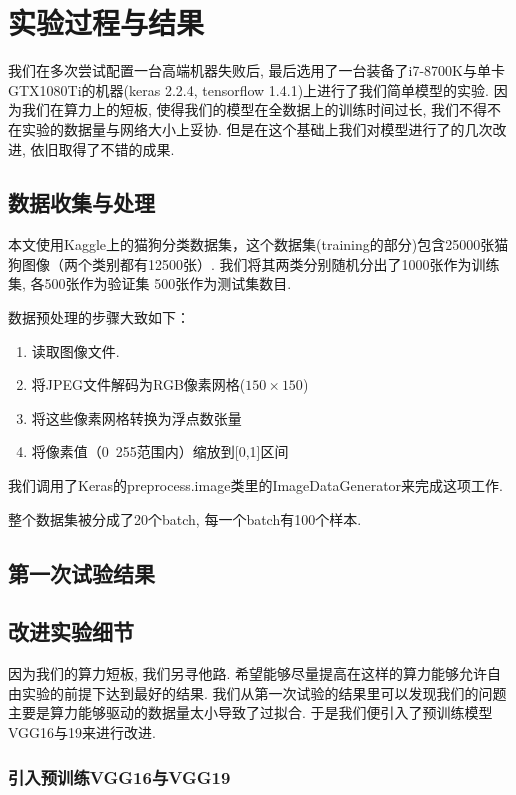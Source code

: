 \documentclass[lang=cn,11pt]{elegantpaper}
\begin{document}
\section{实验过程与结果}

我们在多次尝试配置一台高端机器失败后, 最后选用了一台装备了i7-8700K与单卡GTX1080Ti的机器(keras 2.2.4, tensorflow 1.4.1)上进行了我们简单模型的实验. 因为我们在算力上的短板, 使得我们的模型在全数据上的训练时间过长, 我们不得不在实验的数据量与网络大小上妥协. 但是在这个基础上我们对模型进行了的几次改进, 依旧取得了不错的成果.

\subsection{数据收集与处理}
本文使用Kaggle上的猫狗分类数据集，这个数据集(training的部分)包含25000张猫狗图像（两个类别都有12500张）. 我们将其两类分别随机分出了1000张作为训练集, 各500张作为验证集 500张作为测试集数目.

  数据预处理的步骤大致如下：

\begin{enumerate}
	\item 读取图像文件.
	\item 将JPEG文件解码为RGB像素网格($150\times 150$)
	\item 将这些像素网格转换为浮点数张量
	\item 将像素值（0~255范围内）缩放到[0,1]区间
\end{enumerate}

我们调用了Keras的preprocess.image类里的ImageDataGenerator来完成这项工作.

整个数据集被分成了20个batch, 每一个batch有100个样本.

\subsection{第一次试验结果}


\subsection{改进实验细节}

因为我们的算力短板, 我们另寻他路. 希望能够尽量提高在这样的算力能够允许自由实验的前提下达到最好的结果. 我们从第一次试验的结果里可以发现我们的问题主要是算力能够驱动的数据量太小导致了过拟合. 于是我们便引入了预训练模型VGG16与19来进行改进.


\subsubsection{引入预训练VGG16与VGG19}
\end{document}
